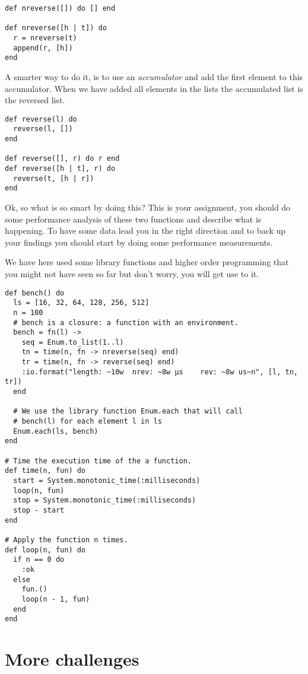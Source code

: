 \documentclass[a4paper,11pt]{article}
\begin{document}
\begin{verbatim}
def nreverse([]) do [] end

def nreverse([h | t]) do
  r = nreverse(t)
  append(r, [h])
end
\end{verbatim}

A smarter way to do it, is to use an {\em accumulator} and add the
first element to this accumulator. When we have added all elements in
the lists the accumulated list is the reversed list.

\begin{verbatim}
def reverse(l) do
  reverse(l, [])
end

def reverse([], r) do r end
def reverse([h | t], r) do
  reverse(t, [h | r])
end
\end{verbatim}

Ok, so what is so smart by doing this? This is your assignment, you
should do some performance analysis of these two functions and
describe what is happening. To have some data lead you in the right
direction and to back up your findings you should start by doing some
performance measurements.

We have here used some library functions and higher order programming
that you might not have seen so far but don't worry, you will get use
to it.

\begin{verbatim}
def bench() do
  ls = [16, 32, 64, 128, 256, 512]
  n = 100
  # bench is a closure: a function with an environment.
  bench = fn(l) ->
    seq = Enum.to_list(1..l)
    tn = time(n, fn -> nreverse(seq) end)
    tr = time(n, fn -> reverse(seq) end)
    :io.format("length: ~10w  nrev: ~8w µs    rev: ~8w us~n", [l, tn, tr])
  end

  # We use the library function Enum.each that will call
  # bench(l) for each element l in ls
  Enum.each(ls, bench)
end

# Time the execution time of the a function.
def time(n, fun) do
  start = System.monotonic_time(:milliseconds)
  loop(n, fun)
  stop = System.monotonic_time(:milliseconds)
  stop - start
end

# Apply the function n times.
def loop(n, fun) do
  if n == 0 do
    :ok
  else
    fun.()
    loop(n - 1, fun)
  end
end
\end{verbatim}



\section{More challenges}
\end{document}
